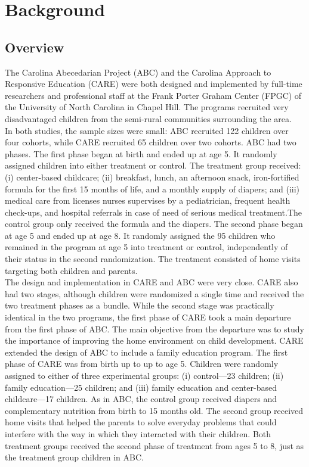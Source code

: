 \singlespacing
\pagebreak
\tableofcontents
\listoffigures
\listoftables
\pagebreak

\section{Background} \label{section:bakcground}
\subsection{Overview}

\noindent The Carolina Abecedarian Project (ABC) and the Carolina Approach to Responsive Education (CARE) were both designed and implemented by full-time researchers and professional staff at the Frank Porter Graham Center (FPGC) of the University of North Carolina in Chapel Hill. The programs recruited very disadvantaged children from the semi-rural communities surrounding the area.\\

\noindent In both studies, the sample sizes were small: ABC recruited 122 children over four cohorts, while CARE recruited 65 children over two cohorts. ABC had two phases. The first phase began at birth and ended up at age 5. It randomly assigned children into either treatment or control. The treatment group received: (i) center-based childcare; (ii) breakfast, lunch, an afternoon snack, iron-fortified formula for the first 15 months of life, and a monthly supply of diapers; and (iii) medical care from licenses nurses supervises by a pediatrician, frequent health check-ups, and hospital referrals in case of need of serious medical treatment.The control group only received the formula and the diapers. The second phase began at age 5 and ended up at age 8. It randomly assigned the 95 children who remained in the program at age 5 into treatment or control, independently of their status in the second randomization. The treatment consisted of home visits targeting both children and parents.\\ 

\noindent The design and implementation in CARE and ABC were very close. CARE also had two stages, although children were randomized a single time and received the two treatment phases as a bundle. While the second stage was practically identical in the two programs, the first phase of CARE took a main departure from the first phase of ABC. The main objective from the departure  was to study the importance of improving the home environment on child development. CARE extended the design of ABC to include a family education program. The first phase of CARE was from birth up to up to age 5. Children were randomly assigned to either of three experimental groups: (i) control---23 children; (ii) family education---25 children; and (iii) family education and center-based childcare---17 children. As in ABC, the control group received diapers and complementary nutrition from birth to 15 months old. The second group received home visits that helped the parents to solve everyday problems that could interfere with the way in which they interacted with their children. Both treatment groups received the second phase of treatment from ages 5 to 8, just as the treatment group children in ABC.\\

